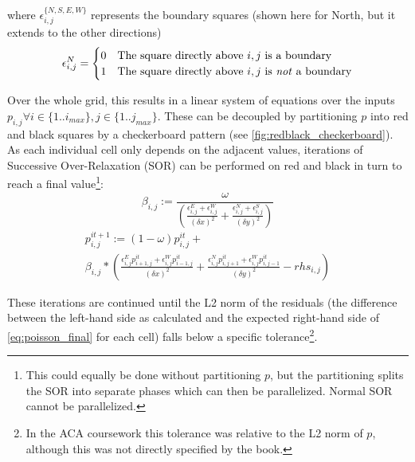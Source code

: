 where $\epsilon_{i,j}^{\{N,S,E,W\}}$ represents the boundary squares (shown here for North, but it extends to the other directions)
\begin{equation}
    \epsilon_{i,j}^{N} = \begin{cases}
        0 & \text{The square directly above $i,j$ is a boundary}\\
        1 & \text{The square directly above $i,j$ is \emph{not} a boundary}
   \end{cases}
\end{equation}



Over the whole grid, this results in a linear system of equations over the inputs $p_{i,j} \forall i \in \{1..i_{max}\}, j \in \{1..j_{max}\}$.
These can be decoupled by partitioning $p$ into red and black squares by a checkerboard pattern (see \cref{fig:redblack_checkerboard}).
As each individual cell only depends on the adjacent values, iterations of Successive Over-Relaxation (SOR) can be performed on red and black in turn to reach a final value\footnote{This could equally be done without partitioning $p$, but the partitioning splits the SOR into separate phases which can then be parallelized. Normal SOR cannot be parallelized\cite{Adams1982AMS}.}\cite{young1971iterative}:
\begin{equation}
    \beta_{i,j} := \frac{\omega}{\left(\frac{\epsilon_{i,j}^E+\epsilon_{i,j}^W}{(\delta{x})^2} + \frac{\epsilon_{i,j}^N+\epsilon_{i,j}^S}{(\delta{y})^2}\right)}
    \label{eq:poisson_beta}
\end{equation}
\begin{multline}
    p^{it+1}_{i,j} := (1 - \omega)p^{it}_{i,j} + \\
    \beta_{i,j} * \left(
    \frac{\epsilon_{i,j}^E p^{it}_{i+1,j}+\epsilon_{i,j}^W p^{it}_{i-1,j}}{(\delta{x})^2} + 
    \frac{\epsilon_{i,j}^N p^{it}_{i,j+1}+\epsilon_{i,j}^W p^{it}_{i,j-1}}{(\delta{y})^2} -
    rhs_{i,j}
    \right)
    \label{eq:poisson_final}
\end{multline}

These iterations are continued until the L2 norm\cite{l2norm} of the residuals (the difference between the left-hand side as calculated and the expected right-hand side of \cref{eq:poisson_final} for each cell) falls below a specific tolerance\footnote{In the ACA coursework this tolerance was relative to the L2 norm of $p$, although this was not directly specified by the book.}\cite{book:griebel1998numerical}.

